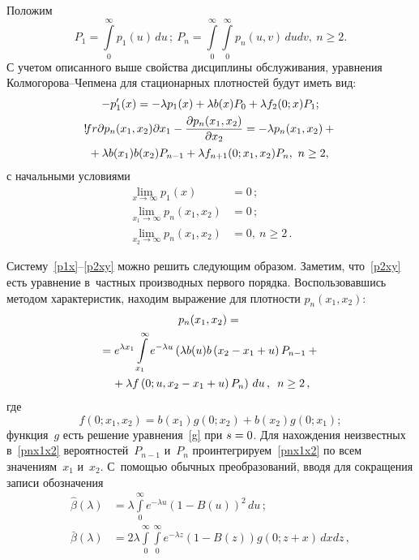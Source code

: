 \begin{multicols}{2}
Положим 
$$
P_1=\int\limits_0^\infty p_1(u)\,du\,;\ 
P_n=\int\limits_0^\infty \int\limits_0^\infty
 p_n(u,v)\,dudv,\ n \ge 2.
 $$ 
С учетом описанного выше свойства дисциплины обслуживания,
уравнения Кол\-мо\-го\-р\-ова--Чеп\-ме\-на для стационарных плотностей
будут иметь вид:
\begin{gather}
\label{p1x}
-p'_{1}(x)=-\lambda p_{1}(x)+\lambda b(x) P_{0}+\lambda f_2(0;x) P_1 ;\\
!\!fr{\partial p_{n}(x_1,x_2) }{\partial x_1}-
\displaystyle\frac{\displaystyle \partial p_{n}(x_1,x_2)\mathstrut}{\displaystyle \partial x_2\mathstrut}=- \lambda p_{n}(x_1,x_2)+{}\notag\\
\!\!\!{}+ \lambda b(x_1)b(x_2) P_{n-1} +
\lambda f_{n+1}(0;x_1,x_2) P_{n}, \ n \ge 2,\!
\label{p2xy}
\end{gather}
с начальными условиями 
\begin{align*}
\lim\limits_{x\rightarrow \infty }p_1(x)&=0\,;\\
\lim\limits_{x_1\rightarrow \infty } p_n(x_1,x_2)&=0\,;\\
\lim\limits_{x_2\rightarrow \infty } p_n(x_1,x_2)&=0,\ n \ge 2\,.
\end{align*}

Систему~\eqref{p1x}--\eqref{p2xy} можно решить следующим образом.
Заметим, что~\eqref{p2xy} есть уравнение в~частных производных первого 
порядка.
Воспользовавшись методом характеристик, находим выражение для 
плотности $p_{n}(x_1,x_2)$:
\begin{multline}
\label{pnx1x2}
p_{n}(x_1,x_2)
={}\\
{}=
e^{\lambda x_1}
\int\limits_{x_1}^{\infty}
e^{-\lambda u}
\left (
\lambda b(u)b\left(x_2-x_1+u\right) P_{n-1} +{}\right.\\
\left.{}+ \lambda f\left(0;u,x_2-
x_1+u\right) P_{n}
\right )\,du\,,\enskip n\geq 2\,,
\end{multline}
\noindent 
где 
$$
f\left(0;x_1,x_2\right)=b\left(x_1\right)g\left(0;x_2\right)+b\left(x_2\right)
g\left(0;x_1\right);
$$
функция~$g$ есть 
решение уравнения~\eqref{g} при $s\hm=0$.
Для нахождения неизвестных в~\eqref{pnx1x2} вероятностей~$P_{n-1}$ 
и~$P_n$
проинтегрируем~\eqref{pnx1x2} по всем значениям~$x_1$ и~$x_2$.
С~по\-мощью обычных преобразований, вводя для сокращения записи 
обозначения 
\begin{align*}
{\hat \beta}(\lambda)
&=
\lambda \int\limits_{0}^{\infty}
e^{-\lambda u}(1-B(u))^2
\,du\,;
\\
{\bar \beta}(\lambda)
&=
2 \lambda \int\limits_{0}^{\infty}
\int\limits_{0}^{\infty}
e^{-\lambda z} (1-B(z))
g(0;z+x) \,dx dz\,,
\end{align*}


\end{multicols}
